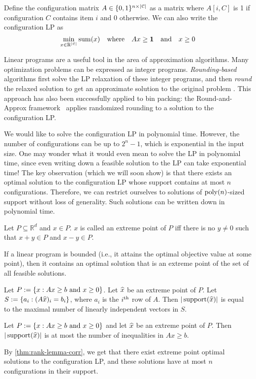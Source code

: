 Define the configuration matrix $A \in \{0, 1\}^{n \times |\mathcal{C}|}$
as a matrix where $A[i, C]$ is 1 if configuration $C$ contains item $i$ and 0 otherwise.
We can also write the configuration LP as
\[ \min_{x \in \mathbb{R}^{|\mathcal{C}|}} \operatorname{sum}(x)
\quad\textrm{where}\quad Ax \ge \mathbf{1} \quad\textrm{and}\quad x \ge 0 \]

Linear programs are a useful tool in the area of approximation algorithms.
Many optimization problems can be expressed as integer programs.
\emph{Rounding-based} algorithms first solve the LP relaxation of these integer programs,
and then \emph{round} the relaxed solution to get an approximate solution to the original problem
\cite{daa:det-lp-round,daa:rand-lp-round,iterative-methods}.
This approach has also been successfully applied to bin packing:
the Round-and-Approx framework~\cite{rna,bansal2014binpacking}
applies randomized rounding to a solution to the configuration LP.

We would like to solve the configuration LP in polynomial time.
However, the number of configurations can be up to $2^n-1$,
which is exponential in the input size.
One may wonder what it would even mean to solve the LP in polynomial time,
since even writing down a feasible solution to the LP can take exponential time!
The key observation (which we will soon show) is that
there exists an optimal solution to the configuration LP
whose support contains at most $n$ configurations.
Therefore, we can restrict ourselves to solutions of $\operatorname{poly}(n)$-sized support
without loss of generality. Such solutions can be written down in polynomial time.

\begin{definition}
Let $P \subseteq \mathbb{R}^d$ and $x \in P$.
$x$ is called an extreme point of $P$ iff there is no $y \neq 0$
such that $x + y \in P$ and $x - y \in P$.
\end{definition}
\begin{lemma}
If a linear program is bounded (i.e., it attains the optimal objective value at some point),
then it contains an optimal solution that is an extreme point of the set of all feasible solutions.
\end{lemma}
\begin{lemma}
Let $P := \{x: Ax \ge b \textrm{ and } x \ge 0\}$. Let $\widehat{x}$ be an extreme point of $P$.
Let $S := \{a_i: (A\widehat{x})_i = b_i\}$, where $a_i$ is the $i^{\textrm{th}}$ row of $A$.
Then $|\operatorname{support}(\widehat{x})|$ is equal to the maximal number of linearly independent vectors in $S$.
\end{lemma}
\begin{corollary}
\label{thm:rank-lemma-corr}
Let $P := \{x: Ax \ge b \textrm{ and } x \ge 0\}$ and let $\widehat{x}$ be an extreme point of $P$.
Then $|\operatorname{support}(\widehat{x})|$ is at most the number of inequalities in $Ax \ge b$.
\end{corollary}
By \cref{thm:rank-lemma-corr}, we get that there exist extreme point optimal solutions
to the configuration LP, and these solutions have at most $n$ configurations in their support.

